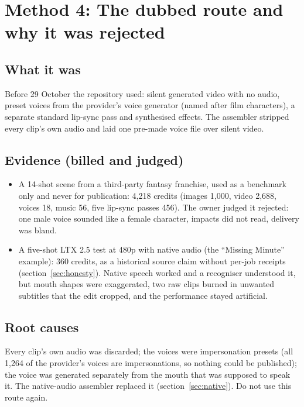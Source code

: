 \documentclass[11pt,a4paper]{article}
\begin{document}
\section{Method 4: The dubbed route and why it was rejected}
\subsection{What it was}
Before 29 October the repository used: silent generated video with no audio, preset voices from the provider's voice generator (named after film characters), a separate standard lip-sync pass and synthesised effects. The assembler stripped every clip's own audio and laid one pre-made voice file over silent video.

\subsection{Evidence (billed and judged)}
\begin{itemize}
\item A 14-shot scene from a third-party fantasy franchise, used as a benchmark only and never for publication: 4,218 credits (images 1,000, video 2,688, voices 18, music 56, five lip-sync passes 456). The owner judged it rejected: one male voice sounded like a female character, impacts did not read, delivery was bland.
\item A five-shot LTX 2.5 test at 480p with native audio (the ``Missing Minute'' example): 360 credits, as a historical source claim without per-job receipts (section~\ref{sec:honesty}). Native speech worked and a recogniser understood it, but mouth shapes were exaggerated, two raw clips burned in unwanted subtitles that the edit cropped, and the performance stayed artificial.
\end{itemize}

\subsection{Root causes}
Every clip's own audio was discarded; the voices were impersonation presets (all 1,264 of the provider's voices are impersonations, so nothing could be published); the voice was generated separately from the mouth that was supposed to speak it. The native-audio assembler replaced it (section~\ref{sec:native}). Do not use this route again.
\end{document}
